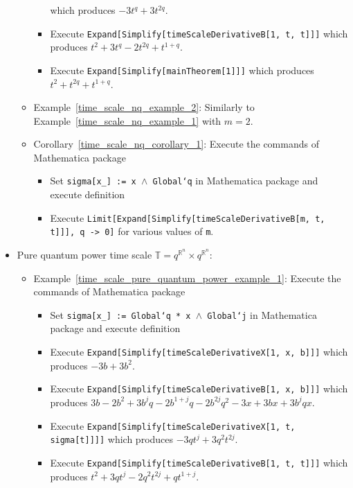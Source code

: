 \begin{itemize}
\begin{itemize}
\begin{itemize}
            which produces $-3 t^q + 3 t^{2 q}$.
            \item Execute \texttt{Expand[Simplify[timeScaleDerivativeB[1, t, t]]]}
            which produces $t^2 + 3 t^q - 2 t^{2 q} + t^{1 + q}$.
            \item Execute \texttt{Expand[Simplify[mainTheorem[1]]]} which produces $t^2 + t^{2 q} + t^{1 + q}$.
        \end{itemize}
        \item Example~\ref{time_scale_nq_example_2}: Similarly to Example~\ref{time_scale_nq_example_1} with $m=2$.
        \item Corollary~\ref{time_scale_nq_corollary_1}:
        Execute the commands of Mathematica package
        \begin{itemize}
            \item Set \texttt{sigma[x\_] := x $\wedge$ Global`q} in Mathematica package and execute definition
            \item Execute \texttt{Limit[Expand[Simplify[timeScaleDerivativeB[m, t, t]]], q -> 0]} for various
            values of \texttt{m}.
        \end{itemize}
    \end{itemize}
    \item Pure quantum power time scale $\mathbb{T} = q^{\mathbb{R}^n} \times q^{\mathbb{R}^n}$:
    \begin{itemize}
        \item Example~\ref{time_scale_pure_quantum_power_example_1}:
        Execute the commands of Mathematica package
        \begin{itemize}
            \item Set \texttt{sigma[x\_] := Global`q * x $\wedge$ Global`j} in Mathematica package and execute definition
            \item Execute \texttt{Expand[Simplify[timeScaleDerivativeX[1, x, b]]]}
            which produces $-3 b + 3 b^2$.
            \item Execute \texttt{Expand[Simplify[timeScaleDerivativeB[1, x, b]]]}
            which produces $3 b - 2 b^2 + 3 b^j q - 2 b^{1 + j} q - 2 b^{2 j} q^2 - 3 x + 3 b x +
            3 b^j q x$.
            \item Execute \texttt{Expand[Simplify[timeScaleDerivativeX[1, t, sigma[t]]]]}
            which produces $-3 q t^j + 3 q^2 t^{2 j}$.
            \item Execute \texttt{Expand[Simplify[timeScaleDerivativeB[1, t, t]]]}
            which produces $t^2 + 3 q t^j - 2 q^2 t^{2 j} + q t^{1 + j}$.

\end{itemize}
\end{itemize}
\end{itemize}
